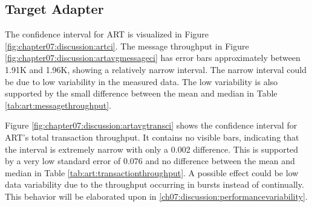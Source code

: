 \subsection{Target Adapter}
The confidence interval for \ac{ART} is visualized in Figure \ref{fig:chapter07:discussion:artci}. The message throughput in Figure \ref{fig:chapter07:discussion:artavgmessageci} has error bars approximately between 1.91K and 1.96K, showing a relatively narrow interval. The narrow interval could be due to low variability in the measured data. The low variability is also supported by the small difference between the mean and median in Table \ref{tab:art:messagethroughput}.

Figure \ref{fig:chapter07:discussion:artavgtransci} shows the confidence interval for \ac{ART}'s total transaction throughput. It contains no visible bars, indicating that the interval is extremely narrow with only a 0.002 difference. This is supported by a very low standard error of 0.076 and no difference between the mean and median in Table \ref{tab:art:transactionthroughput}. A possible effect could be low data variability due to the throughput occurring in bursts instead of continually. This behavior will be elaborated upon in \ref{ch07:discussion:performancevariability}.

